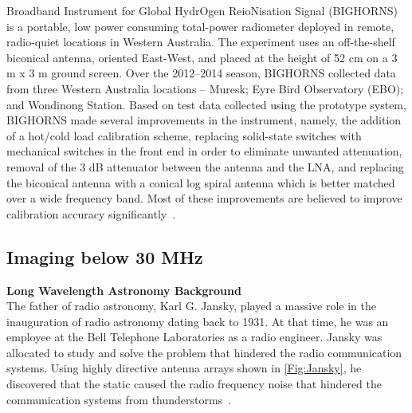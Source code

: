 	    Broadband Instrument for Global HydrOgen ReioNisation Signal
	    (BIGHORNS) is a portable, low power consuming total-power radiometer deployed in remote, radio-quiet locations in Western Australia. The experiment uses an off-the-shelf biconical antenna, oriented East-West, and placed at the height of 52 cm on a 3 m x 3 m ground screen. Over the 2012–2014 season, BIGHORNS collected data from three Western Australia locations – Muresk; Eyre Bird Observatory (EBO); and Wondinong Station. Based on test data collected using the prototype system, BIGHORNS made several improvements in the instrument, namely, the addition of a hot/cold load calibration scheme, replacing solid-state switches with mechanical switches in the front end in order to eliminate unwanted attenuation, removal of the 3 dB attenuator between the antenna and the LNA, and replacing the biconical antenna with a conical log spiral antenna which is better matched over a wide frequency band. Most of these improvements are believed to improve calibration accuracy significantly~\citep{2015PASA...32....4S}.
	    
	    \subsection{Imaging below 30 MHz}
	    
	    {\bf{Long Wavelength Astronomy Background}}\\
	    
	    The father of radio astronomy, Karl G. Jansky, played a massive role in the inauguration of radio astronomy dating back to 1931. At that time, he was an employee at the Bell Telephone Laboratories as a radio engineer. Jansky was allocated to study and solve the problem that hindered the radio communication systems. Using highly directive antenna arrays shown in \autoref{Fig:Jansky}, he discovered that the static caused the radio frequency noise that hindered the communication systems from thunderstorms~\citep{book:BasicsofRA, book:RA}.\\
	    
